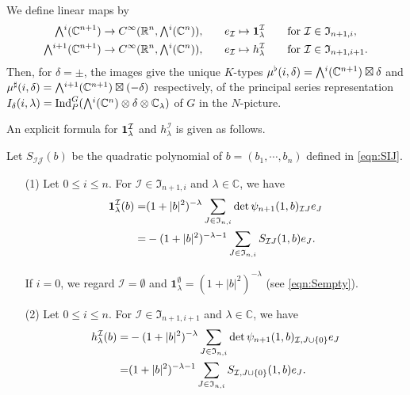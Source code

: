 \begin{proposition}
\label{prop:minKN}
We define linear maps by 
\begin{alignat}{3}
\label{eqn:minlmd}
  \Exterior^i({\mathbb{C}}^{n+1})
  &\to 
  C^{\infty}({\mathbb{R}}^{n}, \Exterior^i({\mathbb{C}}^{n})), 
  \quad
  &&e_{\mathcal{I}} \mapsto {\bf{1}}_{\lambda}^{\mathcal{I}}
  \quad
  &&\text{for ${\mathcal{I}} \in {\mathfrak{I}}_{n+1,i}$}, 
\\
\Exterior^{i+1}({\mathbb{C}}^{n+1})
&\to 
C^{\infty}
({\mathbb{R}}^n,  
 \Exterior^{i}({\mathbb{C}}^{n}) 
), 
\quad
&&e_{\mathcal{I}} \mapsto 
h_{\lambda}^{\mathcal{I}}
\quad
  &&\text{for ${\mathcal{I}} \in {\mathfrak{I}}_{n+1,i+1}$}.  
\notag
\end{alignat}
Then, 
 for $\delta=\pm$, 
 the images give 
 the unique $K$-types 
$
   \mub(i,\delta)=\Exterior^i({\mathbb{C}}^{n+1}) \boxtimes \delta
$
 and 
$\mus(i,\delta)=\Exterior^{i+1}({\mathbb{C}}^{n+1}) \boxtimes (-\delta)$
 respectively, 
 of the principal series representation 
$I_{\delta}(i,\lambda)
=\operatorname{Ind}_P^G
  (\Exterior^i
  ({\mathbb{C}}^{n}) \otimes \delta \otimes {\mathbb{C}}_{\lambda})$
 of $G$ in the $N$-picture.  
\end{proposition}
An explicit formula 
 for ${\bf{1}}_{\lambda}^{\mathcal{I}}$
 and $h_{\lambda}^{\mathcal{I}}$
 is given as follows.  
\begin{lemma}
\label{lem:NKtype}
Let $S_{{\mathcal{I}} {\mathcal{J}}}(b)$
 be the quadratic polynomial 
 of $b=(b_1, \cdots, b_n)$ defined in \eqref{eqn:SIJ}.  
\begin{enumerate}
\item[{\rm{(1)}}]
Let $0 \le i \le n$.  
For ${\mathcal{I}} \in {\mathfrak{I}}_{n+1,i}$
 and $\lambda \in {\mathbb{C}}$, 
 we have 
\begin{align}
  {\bf{1}}_{\lambda}^{\mathcal{I}}(b)
  =& (1+|b|^2)^{-\lambda}
      \sum_{J \in {\mathfrak{I}}_{n,i}}
      \det \psi_{n+1}(1,b)_{{\mathcal{I}} J} e_J
\notag
\\
  =&-(1+|b|^2)^{-\lambda-1}
  \sum_{J \in {\mathfrak{I}}_{n,i}}
  S_{{\mathcal{I}}J}(1,b) e_J.  
\label{eqn:minI}
\end{align}

If $i=0$, 
 we regard ${\mathcal{I}}=\emptyset$
 and ${\mathbf{1}}_{\lambda}^{\emptyset} =(1+|b|^2)^{-\lambda}$
 (see \eqref{eqn:Sempty}).  
\item[{\rm{(2)}}]
Let $0 \le i \le n$.  
For ${\mathcal{I}} \in {\mathfrak{I}}_{n+1,i+1}$
 and $\lambda \in {\mathbb{C}}$, 
 we have 
\begin{align}
h_{\lambda}^{\mathcal{I}}(b)
=&
-(1+|b|^2)^{-\lambda}
      \sum_{J \in {\mathfrak{I}}_{n,i}}
      \det \psi_{n+1}(1,b)_{{\mathcal{I}}, J\cup\{0\}} e_J
\notag
\\
=&
(1+|b|^2)^{-\lambda-1}
\sum_{J \in {\mathfrak{I}}_{n,i}}
S_{{\mathcal{I}},J \cup \{0\}}(1,b)e_J.  
\label{eqn:hIlmd}
\end{align}
\end{enumerate}
\end{lemma}



